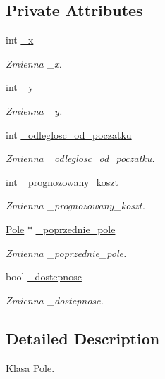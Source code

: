 \subsection*{Private Attributes}
\begin{DoxyCompactItemize}
\item 
int \hyperlink{class_pole_a38ab32b71efba3ca72d77a5eec62ca83}{\+\_\+x}
\begin{DoxyCompactList}\small\item\em Zmienna \+\_\+x. \end{DoxyCompactList}\item 
int \hyperlink{class_pole_ad6807e222bca77d3f8185f69e483b1ee}{\+\_\+y}
\begin{DoxyCompactList}\small\item\em Zmienna \+\_\+y. \end{DoxyCompactList}\item 
int \hyperlink{class_pole_a57fd443aaf2f438db4a136b94dfcb586}{\+\_\+odleglosc\+\_\+od\+\_\+poczatku}
\begin{DoxyCompactList}\small\item\em Zmienna \+\_\+odleglosc\+\_\+od\+\_\+poczatku. \end{DoxyCompactList}\item 
int \hyperlink{class_pole_abb85b44ef47a160b5a82bdd25e691a6e}{\+\_\+prognozowany\+\_\+koszt}
\begin{DoxyCompactList}\small\item\em Zmienna \+\_\+prognozowany\+\_\+koszt. \end{DoxyCompactList}\item 
\hyperlink{class_pole}{Pole} $\ast$ \hyperlink{class_pole_ad2e0e70c96c56f297696948c98d1d862}{\+\_\+poprzednie\+\_\+pole}
\begin{DoxyCompactList}\small\item\em Zmienna \+\_\+poprzednie\+\_\+pole. \end{DoxyCompactList}\item 
bool \hyperlink{class_pole_a71a1d16a81b9c1fbe78055b748defc3e}{\+\_\+dostepnosc}
\begin{DoxyCompactList}\small\item\em Zmienna \+\_\+dostepnosc. \end{DoxyCompactList}\end{DoxyCompactItemize}


\subsection{Detailed Description}
Klasa \hyperlink{class_pole}{Pole}. 

